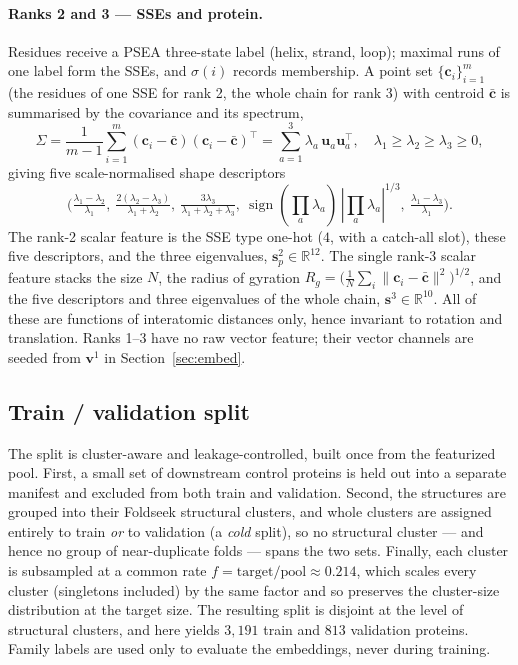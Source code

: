\documentclass[11pt,a4paper]{article}
\theoremstyle{definition}
\begin{document}
\paragraph{Ranks 2 and 3 --- SSEs and protein.} Residues receive a PSEA
three-state label (helix, strand, loop); maximal runs of one label form the SSEs,
and $\sigma(i)$ records membership. A point set $\{\mathbf{c}_i\}_{i=1}^{m}$ (the
residues of one SSE for rank 2, the whole chain for rank 3) with centroid
$\bar{\mathbf{c}}$ is summarised by the covariance and its spectrum,
\[
\Sigma=\frac{1}{m-1}\sum_{i=1}^{m}(\mathbf{c}_i-\bar{\mathbf{c}})(\mathbf{c}_i-\bar{\mathbf{c}})^{\top}
=\sum_{a=1}^{3}\lambda_a\,\mathbf{u}_a\mathbf{u}_a^{\top},\quad
\lambda_1\ge\lambda_2\ge\lambda_3\ge 0,
\]
giving five scale-normalised shape descriptors
\[
\Big(\tfrac{\lambda_1-\lambda_2}{\lambda_1},\
\tfrac{2(\lambda_2-\lambda_3)}{\lambda_1+\lambda_2},\
\tfrac{3\lambda_3}{\lambda_1+\lambda_2+\lambda_3},\
\operatorname{sign}(\textstyle\prod_a\lambda_a)\,|\textstyle\prod_a\lambda_a|^{1/3},\
\tfrac{\lambda_1-\lambda_3}{\lambda_1}\Big).
\]
The rank-2 scalar feature is the SSE type one-hot ($4$, with a catch-all slot),
these five descriptors, and the three eigenvalues,
$\mathbf{s}^{2}_p\in\mathbb{R}^{12}$. The single rank-3 scalar feature stacks the
size $N$, the radius of gyration $R_g=\big(\tfrac1N\sum_i\lVert\mathbf{c}_i-\bar{\mathbf{c}}\rVert^2\big)^{1/2}$,
and the five descriptors and three eigenvalues of the whole chain,
$\mathbf{s}^{3}\in\mathbb{R}^{10}$. All of these are functions of interatomic
distances only, hence invariant to rotation and translation. Ranks 1--3 have no
raw vector feature; their vector channels are seeded from $\mathbf{v}^{1}$ in
Section~\ref{sec:embed}.

\subsection{Train / validation split}
\label{sec:split}

The split is cluster-aware and leakage-controlled, built once from the featurized
pool. First, a small set of downstream control proteins is held out into a separate
manifest and excluded from both train and validation. Second, the structures are
grouped into their Foldseek structural clusters, and whole clusters are assigned
entirely to train \emph{or} to validation (a \emph{cold} split), so no structural
cluster --- and hence no group of near-duplicate folds --- spans the two sets.
Finally, each cluster is subsampled at a common rate
$f=\text{target}/\text{pool}\approx 0.214$, which scales every cluster (singletons
included) by the same factor and so preserves the cluster-size distribution at the
target size. The resulting split is disjoint at the level of structural clusters,
and here yields $3{,}191$ train and $813$ validation proteins. Family labels are
used only to evaluate the embeddings, never during training.
\end{document}
